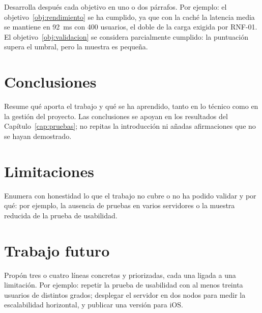 Desarrolla después cada objetivo en uno o dos párrafos. Por ejemplo: el
objetivo~\ref{obj:rendimiento} se ha cumplido, ya que con la caché la latencia
media se mantiene en \qty{92}{ms} con 400 usuarios, el doble de la carga exigida
por RNF-01. El objetivo~\ref{obj:validacion} se considera parcialmente cumplido:
la puntuación supera el umbral, pero la muestra es pequeña.

\section{Conclusiones}
\label{sec:conclusiones}

Resume qué aporta el trabajo y qué se ha aprendido, tanto en lo técnico como en
la gestión del proyecto. Las conclusiones se apoyan en los resultados del
Capítulo~\ref{cap:pruebas}; no repitas la introducción ni añadas afirmaciones
que no se hayan demostrado.

\section{Limitaciones}
\label{sec:limitaciones}

Enumera con honestidad lo que el trabajo no cubre o no ha podido validar y por
qué: por ejemplo, la ausencia de pruebas en varios servidores o la muestra
reducida de la prueba de usabilidad.

\section{Trabajo futuro}
\label{sec:futuro}

Propón tres o cuatro líneas concretas y priorizadas, cada una ligada a una
limitación. Por ejemplo: repetir la prueba de usabilidad con al menos treinta
usuarios de distintos grados; desplegar el servidor en dos nodos para medir la
escalabilidad horizontal, y publicar una versión para iOS.
